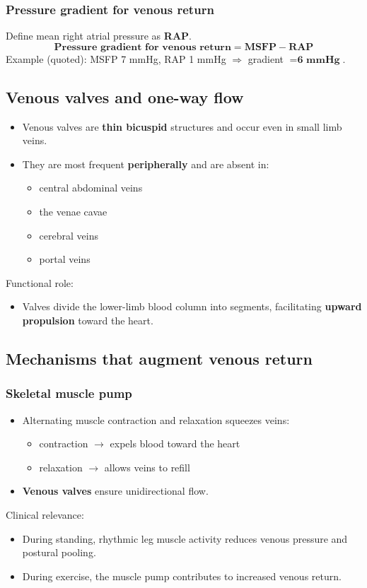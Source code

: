\documentclass[11pt,a4paper]{article}
\begin{document}
\subsubsection{Pressure gradient for venous return}
Define mean right atrial pressure as \textbf{RAP}.
\[
\textbf{Pressure gradient for venous return} = \textbf{MSFP} - \textbf{RAP}
\]
Example (quoted): MSFP 7 mmHg, RAP 1 mmHg $\Rightarrow$ gradient $= \textbf{6 mmHg}$.

\subsection{Venous valves and one-way flow}
\begin{itemize}
\item Venous valves are \textbf{thin bicuspid} structures and occur even in small limb veins.
\item They are most frequent \textbf{peripherally} and are absent in:
  \begin{itemize}
  \item central abdominal veins
  \item the venae cavae
  \item cerebral veins
  \item portal veins
  \end{itemize}
\end{itemize}
Functional role:
\begin{itemize}
\item Valves divide the lower-limb blood column into segments, facilitating \textbf{upward propulsion} toward the heart.
\end{itemize}

\subsection{Mechanisms that augment venous return}

\subsubsection{Skeletal muscle pump}
\begin{itemize}
\item Alternating muscle contraction and relaxation squeezes veins:
  \begin{itemize}
  \item contraction $\rightarrow$ expels blood toward the heart
  \item relaxation $\rightarrow$ allows veins to refill
  \end{itemize}
\item \textbf{Venous valves} ensure unidirectional flow.
\end{itemize}
Clinical relevance:
\begin{itemize}
\item During standing, rhythmic leg muscle activity reduces venous pressure and postural pooling.
\item During exercise, the muscle pump contributes to increased venous return.
\end{itemize}
\end{document}
